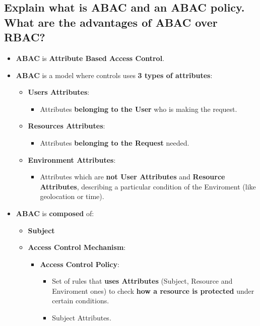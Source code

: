 \documentclass[9pt, letterpaper]{article}
\begin{document}
\subsection{Explain what is ABAC and an ABAC policy. What are the advantages of ABAC over RBAC?}
\begin{itemize}
	\item \textbf{ABAC} is \textbf{Attribute Based Access Control}.
	\item \textbf{ABAC} is a model where controls uses \textbf{3 types of attributes}:
	      \begin{itemize}
		      \item \textbf{Users Attributes}:
		            \begin{itemize}
			            \item Attributes \textbf{belonging to the User} who is making the request.
		            \end{itemize}
		      \item \textbf{Resources Attributes}:
		            \begin{itemize}
			            \item Attributes \textbf{belonging to the Request} needed.
		            \end{itemize}
		      \item \textbf{Environment Attributes}:
		            \begin{itemize}
			            \item Attributes which are \textbf{not User Attributes} and \textbf{Resource Attributes}, describing a particular condition of the Enviroment (like geolocation or time).
		            \end{itemize}
	      \end{itemize}
	\item \textbf{ABAC} is \textbf{composed} of:
	      \begin{itemize}
		      \item \textbf{Subject}
		      \item \textbf{Access Control Mechanism}:
		            \begin{itemize}
			            \item \textbf{Access Control Policy}:
			                  \begin{itemize}
				                  \item Set of rules that \textbf{uses Attributes} (Subject, Resource and Enviroment ones) to check \textbf{how a resource is protected} under certain conditions.
				                  \item Subject Attributes.

\end{itemize}
\end{itemize}
\end{itemize}
\end{itemize}
\end{document}
